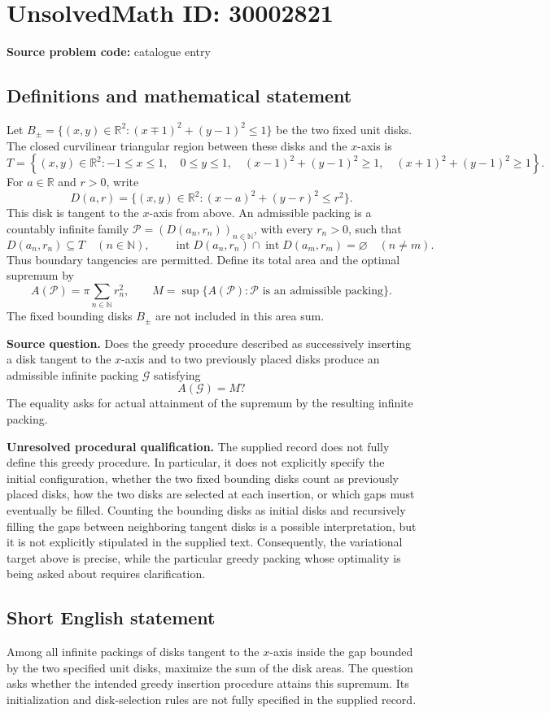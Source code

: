 \documentclass[11pt]{article}
\newcommand{\N}{\mathbb{N}}
\newcommand{\R}{\mathbb{R}}
\begin{document}
\section*{UnsolvedMath ID: 30002821}
\textbf{Source problem code:} catalogue entry
\subsection{Definitions and mathematical statement}
Let \(B_{\pm}=\{(x,y)\in\R^2:(x\mp1)^2+(y-1)^2\leq1\}\) be the two fixed unit disks. The closed curvilinear triangular region between these disks and the \(x\)-axis is
\[
T=\left\{(x,y)\in\R^2:-1\leq x\leq1,\quad 0\leq y\leq1,\quad (x-1)^2+(y-1)^2\geq1,\quad (x+1)^2+(y-1)^2\geq1\right\}.
\]
For \(a\in\R\) and \(r>0\), write
\[
D(a,r)=\{(x,y)\in\R^2:(x-a)^2+(y-r)^2\leq r^2\}.
\]
This disk is tangent to the \(x\)-axis from above. An admissible packing is a countably infinite family \(\mathcal P=(D(a_n,r_n))_{n\in\N}\), with every \(r_n>0\), such that
\[
D(a_n,r_n)\subseteq T\quad(n\in\N),\qquad
\operatorname{int}D(a_n,r_n)\cap\operatorname{int}D(a_m,r_m)=\varnothing\quad(n\ne m).
\]
Thus boundary tangencies are permitted. Define its total area and the optimal supremum by
\[
A(\mathcal P)=\pi\sum_{n\in\N}r_n^2,
\qquad
M=\sup\{A(\mathcal P):\mathcal P\text{ is an admissible packing}\}.
\]
The fixed bounding disks \(B_{\pm}\) are not included in this area sum.

\textbf{Source question.} Does the greedy procedure described as successively inserting a disk tangent to the \(x\)-axis and to two previously placed disks produce an admissible infinite packing \(\mathcal G\) satisfying
\[
A(\mathcal G)=M?
\]
The equality asks for actual attainment of the supremum by the resulting infinite packing.

\textbf{Unresolved procedural qualification.} The supplied record does not fully define this greedy procedure. In particular, it does not explicitly specify the initial configuration, whether the two fixed bounding disks count as previously placed disks, how the two disks are selected at each insertion, or which gaps must eventually be filled. Counting the bounding disks as initial disks and recursively filling the gaps between neighboring tangent disks is a possible interpretation, but it is not explicitly stipulated in the supplied text. Consequently, the variational target above is precise, while the particular greedy packing whose optimality is being asked about requires clarification.
\subsection{Short English statement}
Among all infinite packings of disks tangent to the \(x\)-axis inside the gap bounded by the two specified unit disks, maximize the sum of the disk areas. The question asks whether the intended greedy insertion procedure attains this supremum. Its initialization and disk-selection rules are not fully specified in the supplied record.
\end{document}
